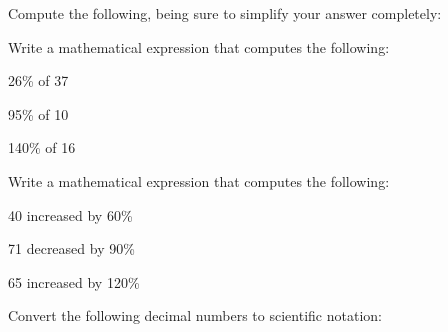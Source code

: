 \documentclass[12pt,letterpaper]{exam}
\begin{document}
\begin{questions}
\newpage



\question[8] Compute the following, being sure to simplify your answer completely: \pspace
{}



\newpage



\question[6] Write a mathematical expression that computes the following: \pspace
\begin{parts}
\item 26\% of 37 \vfill
\item 95\% of 10 \vfill
\item 140\% of 16 \vfill
\end{parts} \vfill



\question[6] Write a mathematical expression that computes the following: \pspace
\begin{parts}
\item 40 increased by 60\% \vfill
\item 71 decreased by 90\% \vfill
\item 65 increased by 120\% \vfill
\end{parts}



\newpage



\question[4] Convert the following decimal numbers to scientific notation: \pspace
{}
\end{questions}
\end{document}
